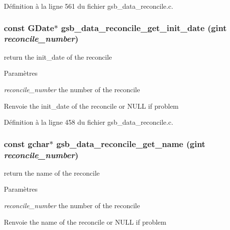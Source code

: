 Définition à la ligne 561 du fichier gsb\_\-data\_\-reconcile.c.

\subsubsection[{gsb\_\-data\_\-reconcile\_\-get\_\-init\_\-date}]{\setlength{\rightskip}{0pt plus 5cm}const GDate$\ast$ gsb\_\-data\_\-reconcile\_\-get\_\-init\_\-date (gint {\em reconcile\_\-number})}\label{gsb__data__reconcile_8c_a34a53feb10b93744a7230407d599b788}
return the init\_\-date of the reconcile


\begin{DoxyParams}{Paramètres}
\item[{\em reconcile\_\-number}]the number of the reconcile\end{DoxyParams}
\begin{DoxyReturn}{Renvoie}
the init\_\-date of the reconcile or NULL if problem 
\end{DoxyReturn}


Définition à la ligne 458 du fichier gsb\_\-data\_\-reconcile.c.

\subsubsection[{gsb\_\-data\_\-reconcile\_\-get\_\-name}]{\setlength{\rightskip}{0pt plus 5cm}const gchar$\ast$ gsb\_\-data\_\-reconcile\_\-get\_\-name (gint {\em reconcile\_\-number})}\label{gsb__data__reconcile_8c_a0f88a3f39b7944967f373097fe9d1474}
return the name of the reconcile


\begin{DoxyParams}{Paramètres}
\item[{\em reconcile\_\-number}]the number of the reconcile\end{DoxyParams}
\begin{DoxyReturn}{Renvoie}
the name of the reconcile or NULL if problem 
\end{DoxyReturn}


